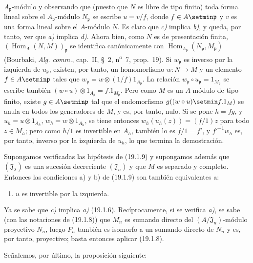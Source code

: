 $A_{\mathfrak p}$-módulo y observando que (puesto que $N$ es libre de tipo
finito) toda forma lineal sobre el $A_{\mathfrak p}$-módulo
$N_{\mathfrak p}$ se escribe $u=v/f$, donde $f\in A\setmin\mathfrak p$ y $v$ es una
forma lineal sobre el $A$-módulo $N$. Es claro que \emph{c)} implica \emph{b)}, y queda, por
tanto, ver que \emph{a)} implica \emph{d)}. Ahora bien, como $N$ es de presentación finita,
$(\operatorname{Hom}_A(N,M))_{\mathfrak p}$ se identifica canónicamente con
$\operatorname{Hom}_{A_{\mathfrak p}}(N_{\mathfrak p},M_{\mathfrak p})$
(Bourbaki, \emph{Alg. comm.}, cap.~II, §~2, n\textsuperscript{o}~7,
prop.~19). Si $w_{\mathfrak p}$ es inverso por la izquierda de $u_{\mathfrak p}$,
existen, por tanto, un homomorfismo $w:N\to M$ y un elemento $f\in A\setmin\mathfrak p$ tales que
$w_{\mathfrak p}=w\otimes(1/f)1_{A_{\mathfrak p}}$. La relación
$w_{\mathfrak p}\circ u_{\mathfrak p}=1_{M_{\mathfrak p}}$ se escribe también
$(w\circ u)\otimes1_{A_{\mathfrak p}}=f.1_{M_{\mathfrak p}}$. Pero como $M$
es un $A$-módulo de tipo finito, existe $g\in A\setmin\mathfrak p$ tal que el
endomorfismo $g((w\circ u)\setmin f.1_M)$ se anula en todos los generadores de $M$, y
es, por tanto, nulo. Si se pone $h=fg$, y
$u_h=u\otimes1_{A_h}$, $w_h=w\otimes1_{A_h}$, se tiene entonces
$w_h(u_h(z))=(f/1)z$ para todo $z\in M_h$; pero como $h/1$ es invertible en
$A_h$, también lo es $f/1=f'$, y $f'^{-1}w_h$ es, por tanto, inverso por la
izquierda de $u_h$, lo que termina la demostración.

\begin{proposition}[19.1.13]
\label{0.19.1.13-fr}
Supongamos verificadas las hipótesis de \textup{(19.1.9)} y supongamos además que
$(\mathfrak J_\lambda)$ es una sucesión decreciente $(\mathfrak J_n)$ y que $M$
es separado y completo. Entonces las condiciones \textup{a)} y \textup{b)} de \textup{(19.1.9)} son
también equivalentes a:
\begin{enumerate}
  \item[\textup{c)}] $u$ es invertible por la izquierda.
\end{enumerate}
\end{proposition}

Ya se sabe que \emph{c)} implica \emph{a)} (19.1.6). Recíprocamente, si se verifica \emph{a)}, se
sabe (con las notaciones de (19.1.8)) que $M_n$ es sumando directo del
$(A/\mathfrak J_n)$-módulo proyectivo $N_n$, luego $P_n$ también es isomorfo a
un sumando directo de $N_n$ y es, por tanto, proyectivo; basta entonces aplicar
(19.1.8).

Señalemos, por último, la proposición siguiente:

